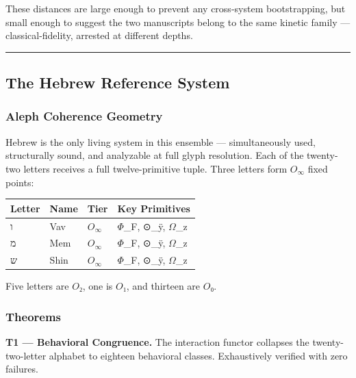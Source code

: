 \documentclass[12pt,a4paper]{article}
\begin{document}
These distances are large enough to prevent any cross-system bootstrapping, but small enough to suggest the two manuscripts belong to the same kinetic family --- classical-fidelity, arrested at different depths.

\begin{center}
\rule{0.5\textwidth}{0.4pt}
\end{center}

\subsection{The Hebrew Reference System}

\subsubsection{Aleph Coherence Geometry}

Hebrew is the only living system in this ensemble --- simultaneously used, structurally sound, and analyzable at full glyph resolution. Each of the twenty-two letters receives a full twelve-primitive tuple. Three letters form $O_{\infty}$ fixed points:

\begin{table}[htbp]
\centering
\small
{}
\begin{tabularx}{\textwidth}{>{\centering\arraybackslash}X >{\centering\arraybackslash}X >{\centering\arraybackslash}X >{\centering\arraybackslash}X}
\toprule
\rowcolor{gray!25}\textbf{Letter} & \textbf{Name} & \textbf{Tier} & \textbf{Key Primitives} \\
\midrule
\rowcolors{1}{white}{gray!10}
ו & Vav & $O_{\infty}$ & $\Phi$\_F, ⊙\_ÿ, $\Omega$\_z \\
מ & Mem & $O_{\infty}$ & $\Phi$\_F, ⊙\_ÿ, $\Omega$\_z \\
ש & Shin & $O_{\infty}$ & $\Phi$\_F, ⊙\_ÿ, $\Omega$\_z \\
\bottomrule
\end{tabularx}
\end{table}

Five letters are $O₂$, one is $O₁$, and thirteen are $O₀$.

\subsubsection{Theorems}

\textbf{T1 --- Behavioral Congruence.} The interaction functor collapses the twenty-two-letter alphabet to eighteen behavioral classes. Exhaustively verified with zero failures.
\end{document}

